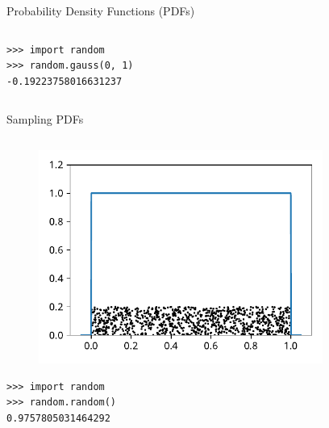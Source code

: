 \documentclass[12pt, aspectratio=149]{beamer}
\theoremstyle{plain}
\begin{document}
\begin{frame}[fragile]{Probability Density Functions (PDFs)}
\begin{columns}
\begin{column}{0.5\textwidth}
\begin{center}
\begin{figure}
     \end{figure}
      \begin{verbatim}
>>> import random
>>> random.gauss(0, 1)
-0.19223758016631237
      \end{verbatim}
     \end{center}
\end{column}
\end{columns}
\end{frame}

\begin{frame}[fragile]{Sampling PDFs}
\begin{columns}
\begin{column}{0.5\textwidth}
    \begin{center}
     \begin{figure}
     	\centering
     	\includegraphics[width=0.99\linewidth]{figures/uniform_samples}
     \end{figure}
     \begin{verbatim}
>>> import random
>>> random.random()
0.9757805031464292
     \end{verbatim}
     \end{center}
\end{column}
\begin{column}{0.5\textwidth}  %
    \begin{center}
     \begin{figure}
     	\centering

\end{figure}
\end{center}
\end{column}
\end{columns}
\end{frame}
\end{document}
